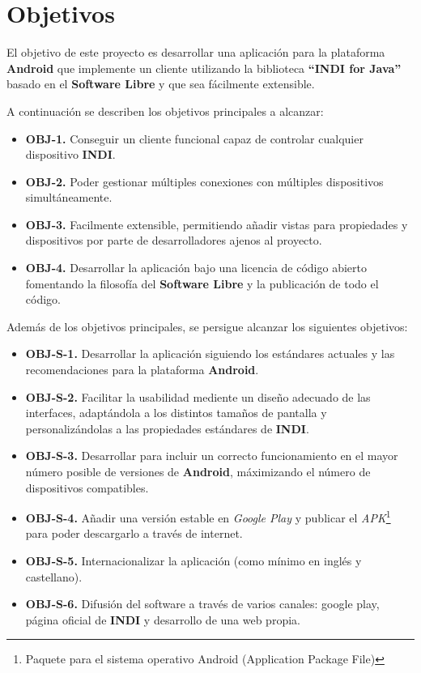 \chapter{Objetivos}

El objetivo de este proyecto es desarrollar una aplicación para la plataforma \textbf{Android} que implemente un cliente utilizando la  biblioteca \textbf{``INDI for Java''} basado en el \textbf{Software Libre} y que sea fácilmente extensible.

\bigskip
A continuación se describen los objetivos principales a alcanzar:

\begin{itemize}
  \item \textbf{OBJ-1.} Conseguir un cliente funcional capaz de controlar cualquier dispositivo \textbf{INDI}.
  \item \textbf{OBJ-2.} Poder gestionar múltiples conexiones con múltiples dispositivos simultáneamente.
  \item \textbf{OBJ-3.} Facilmente extensible, permitiendo añadir vistas para propiedades y  dispositivos por parte de desarrolladores ajenos al proyecto.
  \item \textbf{OBJ-4.} Desarrollar la aplicación bajo una licencia de código abierto fomentando la filosofía del \textbf{Software Libre} y la publicación de todo el código.
\end{itemize}

\bigskip
Además de los objetivos principales, se persigue alcanzar los siguientes objetivos:

\begin{itemize}
  \item \textbf{OBJ-S-1.} Desarrollar la aplicación siguiendo los estándares actuales y las recomendaciones para la plataforma \textbf{Android}.
  \item \textbf{OBJ-S-2.} Facilitar la usabilidad mediente un diseño adecuado de las interfaces, adaptándola a los distintos tamaños de pantalla y personalizándolas a las propiedades estándares de \textbf{INDI}.
  \item \textbf{OBJ-S-3.} Desarrollar para incluir un correcto funcionamiento en el mayor número posible de versiones de \textbf{Android}, máximizando el número de dispositivos compatibles.
  \item \textbf{OBJ-S-4.} Añadir una versión estable en \textit{Google Play} y publicar el \textit{APK}\footnote{Paquete para el sistema operativo Android (Application Package File)} para poder descargarlo a través de internet.
  \item \textbf{OBJ-S-5.} Internacionalizar la aplicación (como mínimo en inglés y castellano).
  \item \textbf{OBJ-S-6.} Difusión del software a través de varios canales: google play, página oficial de \textbf{INDI} y desarrollo de una web propia.
\end{itemize}

